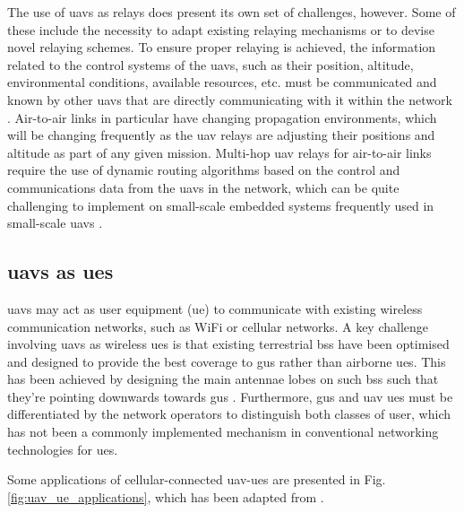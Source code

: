 The use of \acrshort{uav}s as relays does present its own set of challenges, however. Some of these include the necessity to adapt existing relaying mechanisms or to devise novel relaying schemes. 
To ensure proper relaying is achieved, the information related to the control systems of the \acrshort{uav}s, such as their position, altitude, environmental conditions, available resources, etc. must be communicated and known by other \acrshort{uav}s that are directly communicating with it within the network \cite{saad_wireless_2020}. 
Air-to-air links in particular have changing propagation environments, which will be changing frequently as the \acrshort{uav} relays are adjusting their positions and altitude as part of any given mission. 
Multi-hop \acrshort{uav} relays for air-to-air links require the use of dynamic routing algorithms based on the control and communications data from the \acrshort{uav}s in the network, which can be quite challenging to implement on small-scale embedded systems frequently used in small-scale \acrshort{uav}s \cite{saad_wireless_2020}. 

\subsection{\texorpdfstring{\acrshort{uav}s as \acrshort{ue}s}{UAVs as UEs}}
\acrshort{uav}s may act as user equipment (\acrshort{ue}) to communicate with existing wireless communication networks, such as WiFi or cellular networks. 
A key challenge involving \acrshort{uav}s as wireless \acrshort{ue}s is that existing terrestrial \acrshort{bs}s have been optimised and designed to provide the best coverage to \acrshort{gu}s rather than airborne \acrshort{ue}s. This has been achieved by designing the main antennae lobes on such \acrshort{bs}s such that they're pointing downwards towards \acrshort{gu}s \cite{saad_wireless_2020}. 
Furthermore, \acrshort{gu}s and \acrshort{uav} \acrshort{ue}s must be differentiated by the network operators to distinguish both classes of user, which has not been a commonly implemented mechanism in conventional networking technologies for \acrshort{ue}s. 

Some applications of cellular-connected \acrshort{uav}-\acrshort{ue}s are presented in Fig. \ref{fig:uav_ue_applications}, which has been adapted from \cite{challita_machine_2019}. 

